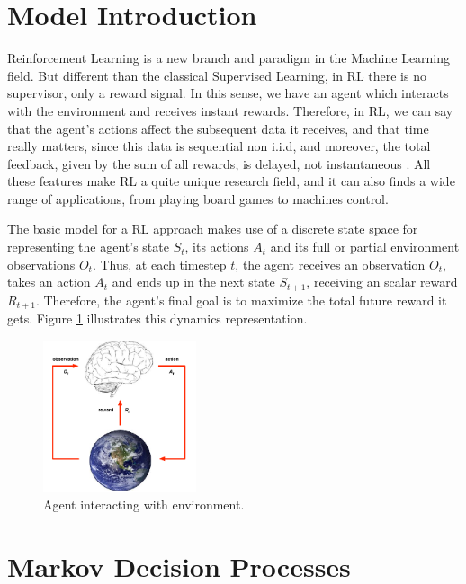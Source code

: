 \section{Model Introduction}

Reinforcement Learning is a new branch and paradigm in the Machine Learning field. But different than the classical Supervised Learning, in RL there is no supervisor, only a reward signal. In this sense, we have an agent which interacts with the environment and receives instant rewards. Therefore, in RL, we can say that the agent's actions affect the subsequent data it receives, and that time really matters, since this data is sequential non i.i.d, and moreover, the total feedback, given by the sum of all rewards, is delayed, not instantaneous \cite{Sutton1998}. All these features make RL a quite unique research field, and it can also finds a wide range of applications, from playing board games to machines control.

The basic model for a RL approach makes use of a discrete state space for representing the agent's state $S_t$, its actions $A_t$ and its full or partial environment observations $O_t$. Thus, at each timestep $t$, the agent receives an observation $O_t$, takes an action $A_t$ and ends up in the next state $S_{t+1}$, receiving an scalar reward $R_{t+1}$. Therefore, the agent's final goal is to maximize the total future reward it gets. Figure \ref{fig:RL_basic_model} illustrates this dynamics representation.

\begin{figure}[H]
    \centering
    \includegraphics[width=0.4\textwidth]{Chapter2/RL_basic_model.png} 
    \caption{Agent interacting with environment.}
    \label{fig:RL_basic_model}
\end{figure}


\section{Markov Decision Processes}

